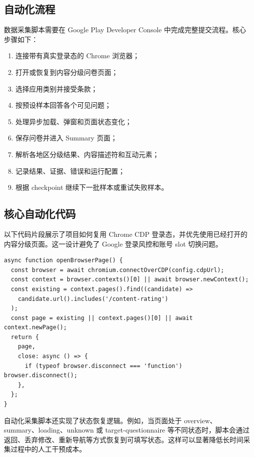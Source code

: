 \documentclass[UTF8]{ctexart}
\begin{document}
\subsection{自动化流程}

数据采集脚本需要在 Google Play Developer Console 中完成完整提交流程。核心步骤如下：

\begin{enumerate}[leftmargin=2em]
  \item 连接带有真实登录态的 Chrome 浏览器；
  \item 打开或恢复到内容分级问卷页面；
  \item 选择应用类别并接受条款；
  \item 按预设样本回答各个可见问题；
  \item 处理异步加载、弹窗和页面状态变化；
  \item 保存问卷并进入 Summary 页面；
  \item 解析各地区分级结果、内容描述符和互动元素；
  \item 记录结果、证据、错误和运行配置；
  \item 根据 checkpoint 继续下一批样本或重试失败样本。
\end{enumerate}

\subsection{核心自动化代码}

以下代码片段展示了项目如何复用 Chrome CDP 登录态，并优先使用已经打开的内容分级页面。这一设计避免了 Google 登录风控和账号 slot 切换问题。

\begin{lstlisting}[caption={连接真实 Chrome 并复用内容分级页面的核心逻辑}]
async function openBrowserPage() {
  const browser = await chromium.connectOverCDP(config.cdpUrl);
  const context = browser.contexts()[0] || await browser.newContext();
  const existing = context.pages().find((candidate) =>
    candidate.url().includes('/content-rating')
  );
  const page = existing || context.pages()[0] || await context.newPage();
  return {
    page,
    close: async () => {
      if (typeof browser.disconnect === 'function') browser.disconnect();
    },
  };
}
\end{lstlisting}

自动化采集脚本还实现了状态恢复逻辑。例如，当页面处于 overview、summary、loading、unknown 或 target-questionnaire 等不同状态时，脚本会通过返回、丢弃修改、重新导航等方式恢复到可填写状态。这样可以显著降低长时间采集过程中的人工干预成本。
\end{document}
